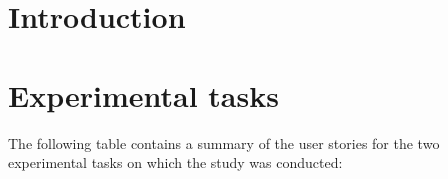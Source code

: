 \section{Introduction}


\section{Experimental tasks}
The following table contains a summary of the user stories for the two experimental tasks on which the study was conducted:

